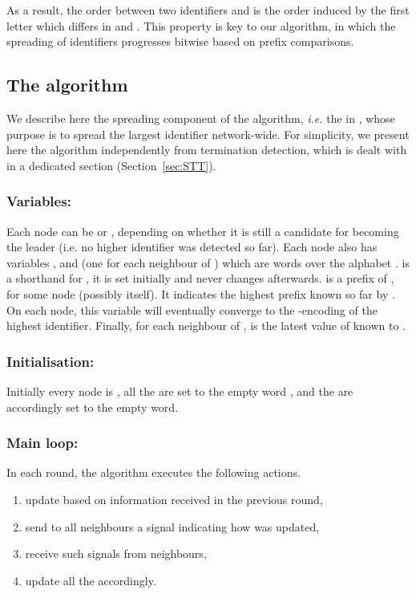 \documentclass[11pt,envcountsame,letterpaper]{llncs}
\begin{document}
As a result, the order between two identifiers  and 
is the order induced by the first letter which differs in  and .
This property is key to our algorithm, in which the spreading of identifiers progresses bitwise based on prefix comparisons.

\subsection{The  algorithm }
We describe here the spreading component of the algorithm, {\it i.e.} the  in \STT, whose purpose is to spread the largest identifier network-wide. For simplicity, we present here the algorithm independently from termination detection, which is dealt with in a dedicated section (Section~\ref{sec:STT}).

\subsubsection{Variables:} Each node can be  or , depending on whether it is still a candidate for becoming the leader (i.e. no higher identifier was detected so far). Each node  also has variables ,  and
  (one for each neighbour  of ) which are words over the alphabet .  is a shorthand for , it is set initially and never changes afterwards.  is a prefix of , for some node  (possibly  itself). It indicates the highest prefix known so far by .
On each node, this variable will eventually converge to the -encoding of the highest identifier. Finally, for each neighbour  of , 
 is the latest value of  known to . 

\subsubsection{Initialisation:} Initially every node  is , all the  are set to the empty word , and the  are accordingly set to the empty word.

\subsubsection{Main loop:}  In each round, the algorithm executes the following actions.
\begin{enumerate}[leftmargin=3em]
\item update  based on information received in the previous round,
\item send to all neighbours a signal indicating how  was updated,
\item receive such signals from neighbours,
\item update all the  accordingly.
\end{enumerate}
\end{document}
